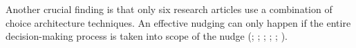 Another crucial finding is that only six research articles use a combination of choice architecture techniques. An effective nudging can only happen if the entire decision-making process is taken into scope of the nudge (\cite{miller_effects_2016}; \cite{hilton_tax_2014}; \cite{cosmo_nudging_2017}; \cite{mazar_if_2018}; \cite{basu_choosing_2017}; \cite{schneider_nudging_2017}). 

